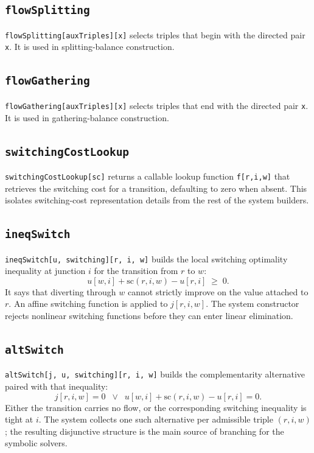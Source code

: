 \documentclass[11pt]{article}
\begin{document}
\subsection*{\texttt{flowSplitting}}

\texttt{flowSplitting[auxTriples][x]} selects triples that begin with the directed pair \texttt{x}. It is used in splitting-balance construction.

\subsection*{\texttt{flowGathering}}

\texttt{flowGathering[auxTriples][x]} selects triples that end with the directed pair \texttt{x}. It is used in gathering-balance construction.

\subsection*{\texttt{switchingCostLookup}}

\texttt{switchingCostLookup[sc]} returns a callable lookup function \texttt{f[r,i,w]} that retrieves the switching cost for a transition, defaulting to zero when absent. This isolates switching-cost representation details from the rest of the system builders.

\subsection*{\texttt{ineqSwitch}}

\texttt{ineqSwitch[u, switching][r, i, w]} builds the local switching optimality inequality at junction $i$ for the transition from $r$ to $w$:
\[
u[w, i] + \mathrm{sc}(r, i, w) - u[r, i] \;\ge\; 0.
\]
It says that diverting through $w$ cannot strictly improve on the value attached to $r$.
An affine switching function is applied to $j[r,i,w]$. The system constructor
rejects nonlinear switching functions before they can enter linear elimination.

\subsection*{\texttt{altSwitch}}

\texttt{altSwitch[j, u, switching][r, i, w]} builds the complementarity alternative paired with that inequality:
\[
j[r, i, w] = 0 \;\;\vee\;\; u[w, i] + \mathrm{sc}(r, i, w) - u[r, i] = 0.
\]
Either the transition carries no flow, or the corresponding switching inequality is tight at $i$. The system collects one such alternative per admissible triple $(r, i, w)$; the resulting disjunctive structure is the main source of branching for the symbolic solvers.
\end{document}
